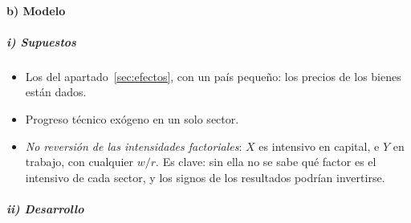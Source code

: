 \documentclass[11pt]{article}
\begin{document}
\paragraph{b) Modelo}

\subparagraph{i) Supuestos}

\begin{itemize}
\item Los del apartado~\ref{sec:efectos}, con un país pequeño: los precios de los bienes están dados.
\item Progreso técnico exógeno en un solo sector.
\item \emph{No reversión de las intensidades factoriales}: $X$ es intensivo en capital, e $Y$ en trabajo, con cualquier $w/r$. Es clave: sin ella no se sabe qué factor es el intensivo de cada sector, y los signos de los resultados podrían invertirse.
\end{itemize}

\subparagraph{ii) Desarrollo}
\end{document}
